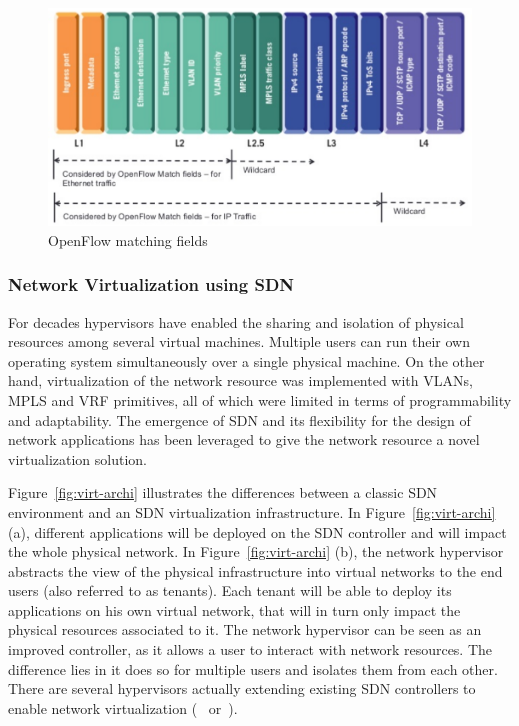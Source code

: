 \begin{figure}[h]
    \centering
    \includegraphics[scale=0.7]{figures/openflow-matchfields.pdf}
    \caption{OpenFlow matching fields~\cite{openflow-matchfields}}
    \label{fig:matching-fields}
\end{figure}

\subsubsection{Network Virtualization using SDN}
\label{def:netvirt}

For decades hypervisors have enabled the sharing and isolation of physical resources among several virtual machines.
Multiple users can run their own operating system simultaneously over a single physical machine.
On the other hand, virtualization of the network resource was implemented with VLANs, MPLS and VRF primitives, all of which were limited in terms of programmability and adaptability. The emergence of SDN and its flexibility for the design of network applications has been leveraged to give the network resource a novel virtualization solution.

Figure~\ref{fig:virt-archi} illustrates the differences between a classic SDN environment and an SDN virtualization infrastructure. In Figure~\ref{fig:virt-archi} (a), different applications will be deployed on the SDN controller and will impact the whole physical network.
In Figure~\ref{fig:virt-archi} (b), the network hypervisor abstracts the view of the physical infrastructure into virtual networks to the end users (also referred to as tenants).
Each tenant will be able to deploy its applications on his own virtual network, that will in turn only impact the physical resources associated to it.
The network hypervisor can be seen as an improved controller, as it allows a user to interact with network resources. The difference lies in it does so for multiple users and isolates them from each other.
There are several hypervisors actually extending existing SDN controllers to enable network virtualization (\eg~\cite{FlowN-Drutskoy2012} or~\cite{ONVisor-Han2018}).

